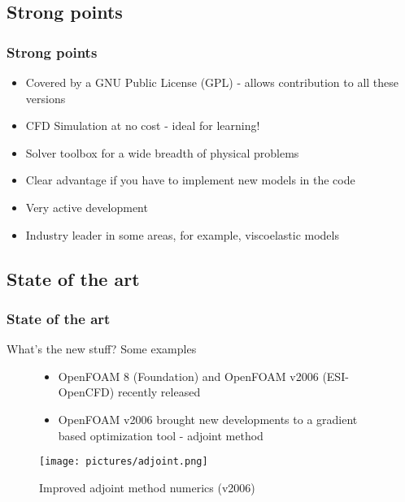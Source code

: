 \documentclass[notheorems, aspectratio=169]{beamer}
\begin{document}
\subsection{Strong points}
\begin{frame}
\frametitle{Strong points}
\begin{itemize}
  \item Covered by a GNU Public License (GPL) - allows contribution to all these versions
  \item CFD Simulation at no cost - ideal for learning!
  \item Solver toolbox for a wide breadth of physical problems
  \item Clear advantage if you have to implement new models in the code
  \item Very active development
  \item Industry leader in some areas, for example, viscoelastic models 
\end{itemize}
\end{frame}



\subsection{State of the art}
\begin{frame}
\frametitle{State of the art}
What's the new stuff? Some examples
\begin{figure}[!htb]
  \centering
  \begin{minipage}{.4\textwidth}
    \begin{itemize}
      \item OpenFOAM 8 (Foundation) and OpenFOAM v2006 (ESI-OpenCFD) recently released
      \item OpenFOAM v2006 brought new developments to a  gradient based optimization tool - adjoint method
     \end{itemize}
  \end{minipage}%
  \begin{minipage}{0.4\textwidth}
      \centering
      \texttt{[image: pictures/adjoint.png]}
      \caption{Improved adjoint method numerics (v2006)}
  \end{minipage}
\end{figure}
  
\end{frame}
\end{document}
